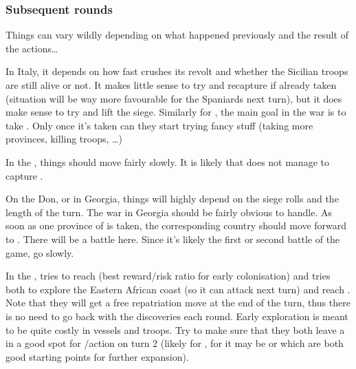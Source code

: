 \subsubsection{Subsequent rounds}
Things can vary wildly depending on what happened previously and the result of
the actions\ldots

\aparag In Italy, it depends on how fast \HIS crushes its revolt and whether
the Sicilian troops are still alive or not.
\bparag It makes little sense to try and recapture \villeNaples if already
taken (situation will be way more favourable for the Spaniards next turn), but
it does make sense to try and lift the siege.
\bparag Similarly for \FRA, the main goal in the war is to take
\villeNaples. Only once it's taken can they start trying fancy stuff (taking
more provinces, killing troops, \ldots)

\aparag In the \regionBalkans, things should move fairly slowly. It is likely
that \VEN does not manage to capture \villeRagusa.

\aparag On the Don, or in Georgia, things will highly depend on the siege
rolls and the length of the turn. The war in Georgia should be fairly obvious
to handle.
\bparag As soon as one province of \paysCosaquesdon is taken, the
corresponding country should move forward to \provinceDon. There will be a
battle here. Since it's likely the first or second battle of the game, go
slowly.

\aparag In the \ROTW, \HIS tries to reach \granderegionCuba (best reward/risk
ratio for early colonisation) and \POR tries both to explore the Eastern
African coast (so it can attack \paysGujerat next turn) and reach
.
\bparag Note that they will get a free repatriation move at the end of the
turn, thus there is no need to go back with the discoveries each round.
\bparag Early exploration is meant to be quite costly in vessels and troops.
\bparag Try to make sure that they both leave a \LeaderC in a good spot for
\COL/\TP action on turn 2 (likely \granderegionCuba for \HIS, for \POR it may
be  or  which are both good starting
points for further expansion).


